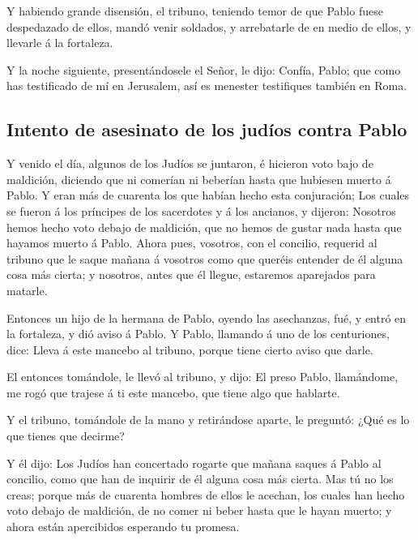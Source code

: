  Y habiendo grande disensión, el tribuno, teniendo temor de
que Pablo fuese despedazado de ellos, mandó venir soldados, y
arrebatarle de en medio de ellos, y llevarle á la fortaleza.

 Y la noche siguiente, presentándosele el Señor, le dijo:
Confía, Pablo; que como has testificado de mí en Jerusalem, así es
menester testifiques también en Roma.

\hypertarget{intento-de-asesinato-de-los-juduxedos-contra-pablo}{%
\subsection{Intento de asesinato de los judíos contra
Pablo}\label{intento-de-asesinato-de-los-juduxedos-contra-pablo}}

 Y venido el día, algunos de los Judíos se juntaron, é
hicieron voto bajo de maldición, diciendo que ni comerían ni beberían
hasta que hubiesen muerto á Pablo.  Y eran más de cuarenta
los que habían hecho esta conjuración;  Los cuales se
fueron á los príncipes de los sacerdotes y á los ancianos, y dijeron:
Nosotros hemos hecho voto debajo de maldición, que no hemos de gustar
nada hasta que hayamos muerto á Pablo.  Ahora pues,
vosotros, con el concilio, requerid al tribuno que le saque mañana á
vosotros como que queréis entender de él alguna cosa más cierta; y
nosotros, antes que él llegue, estaremos aparejados para matarle.

 Entonces un hijo de la hermana de Pablo, oyendo las
asechanzas, fué, y entró en la fortaleza, y dió aviso á Pablo.
 Y Pablo, llamando á uno de los centuriones, dice: Lleva á
este mancebo al tribuno, porque tiene cierto aviso que darle.

 El entonces tomándole, le llevó al tribuno, y dijo: El
preso Pablo, llamándome, me rogó que trajese á ti este mancebo, que
tiene algo que hablarte.

 Y el tribuno, tomándole de la mano y retirándose aparte,
le preguntó: ¿Qué es lo que tienes que decirme?

 Y él dijo: Los Judíos han concertado rogarte que mañana
saques á Pablo al concilio, como que han de inquirir de él alguna cosa
más cierta.  Mas tú no los creas; porque más de cuarenta
hombres de ellos le acechan, los cuales han hecho voto debajo de
maldición, de no comer ni beber hasta que le hayan muerto; y ahora están
apercibidos esperando tu promesa.

